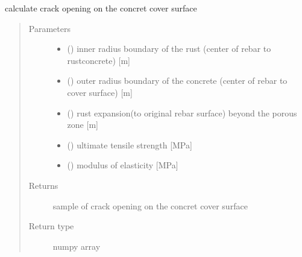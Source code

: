 \documentclass[letterpaper,10pt,english]{sphinxmanual}
\begin{document}
\begin{fulllineitems}
\label{\detokenize{cracking:cracking.crack_width_open}}
\sphinxAtStartPar
calculate crack opening on the concret cover surface
\begin{quote}\begin{description}
\item[{Parameters}] \leavevmode\begin{itemize}
\item {} 
\sphinxAtStartPar
{} () \textendash{} inner radius boundary of the rust (center of rebar to rust\sphinxhyphen{}concrete) {[}m{]}

\item {} 
\sphinxAtStartPar
{} () \textendash{} outer radius boundary of the concrete (center of rebar to cover surface) {[}m{]}

\item {} 
\sphinxAtStartPar
{} () \textendash{} rust expansion(to original rebar surface) beyond the porous zone {[}m{]}

\item {} 
\sphinxAtStartPar
{} () \textendash{} ultimate tensile strength {[}MPa{]}

\item {} 
\sphinxAtStartPar
{} () \textendash{} modulus of elasticity {[}MPa{]}

\end{itemize}

\item[{Returns}] \leavevmode
\sphinxAtStartPar
sample of crack opening on the concret cover surface

\item[{Return type}] \leavevmode
\sphinxAtStartPar
numpy array

\end{description}\end{quote}

\end{fulllineitems}
\end{document}

